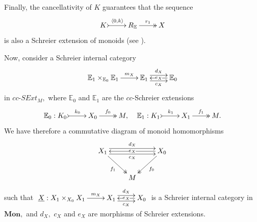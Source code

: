 \documentclass[a4paper]{amsart}
\theoremstyle{plain}
\theoremstyle{definition}
\theoremstyle{remark}
\newcommand{\la}{\langle}
\newcommand{\ra}{\rangle}
\begin{document}
Finally, the cancellativity of $K$ guarantees that the sequence
\begin{equation*}
\xymatrix{{K} \ar@{>->}[r]^-{\la0,k\ra} &{R_{\mathbb{E}}} \ar@{->>}[r]^-{r_1} &X}
\end{equation*}
is also a Schreier extension of monoids (see \cite[Proposition 5.5]{AMR}).

Now, consider a Schreier internal category
\begin{equation}
\label{eqn:schreier_category_SExt_M_with_Es}
\xymatrix{
{{{\mathbb{E}}_1}\times_{{\mathbb{E}}_0}{{\mathbb{E}}_1}} \ar[r]^-{m_X} &{{\mathbb{E}}_1} \ar@<.9ex>[r]^-{d_X} \ar@<-.9ex>[r]_-{c_X} &{{\mathbb{E}}_0} \ar[l]|-{e_X}
}
\end{equation}
in $cc\text{-}SExt_M,$ where $\mathbb{E}_0$ and $\mathbb{E}_1$ are the $cc$-Schreier extensions
\begin{equation*}
\begin{aligned}
{\xymatrix{{\mathbb{E}_0:K_0} \ar@{>->}[r]^-{k_0} &{X_0} \ar@{->>}[r]^-{f_0} &{M,}}}
\
\
{\xymatrix{{\mathbb{E}_1:K_1} \ar@{>->}[r]^-{k_1} &{X_1} \ar@{->>}[r]^-{f_1} &{M.}}}
\end{aligned}
\end{equation*}
We have therefore a commutative diagram of monoid homomorphisms
\begin{equation}
\begin{aligned}
\label{eqn:schreier_category_SExt_M}
\xymatrix{
{X_1} \ar@{->>}[rd]_-{f_1} \ar@<.9ex>[rr]^-{d_X} \ar@<-.9ex>[rr]_-{c_X} &\ &{X_0} \ar@{->>}[ld]^-{f_0} \ar[ll]|-{e_X} \\
&M
}
\end{aligned}
\end{equation}
such that $\xymatrix{{\underline{X}: X_1\times_{X_0}X_1} \ar[r]^-{m_X} &{X_1} \ar@<.9ex>[r]^-{d_X} \ar@<-.9ex>[r]_-{c_X} &{X_0} \ar[l]|-{e_X}}$ is a Schreier internal category in $\mathbf{Mon},$ and $d_X,$ $c_X$ and $e_X$ are morphisms of Schreier extensions.
\end{document}
